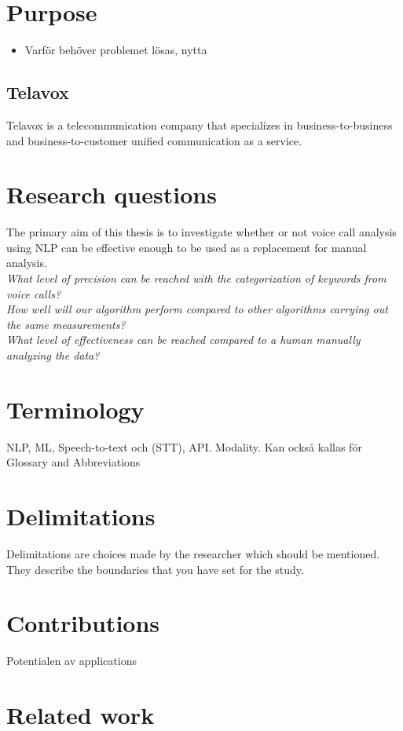 \documentclass[nofilelist]{cslthse-msc}
\begin{document}
\section{Purpose}
\begin{itemize}
    \item Varför behöver problemet lösas, nytta
\end{itemize}
\subsection{Telavox}
Telavox is a telecommunication company that specializes in business-to-business and business-to-customer unified communication as a service. 
\section{Research questions}
The primary aim of this thesis is to investigate whether or not voice call analysis using NLP can be effective enough to be used as a replacement for manual analysis. \\
\textit{What level of precision can be reached with the categorization of keywords from voice calls?}\\
\textit{How well will our algorithm perform compared to other algorithms carrying out the same measurements?}\\
\textit{What level of effectiveness can be reached compared to a human manually analyzing the data?} 

\section{Terminology}
NLP, ML, Speech-to-text och (STT), API. Modality. Kan också kallas för Glossary and Abbreviations
\section{Delimitations}
Delimitations are choices made by the researcher which should be mentioned. They describe the boundaries that you have set for the study.
\section{Contributions}
Potentialen av applications 
\section{Related work}
\end{document}
